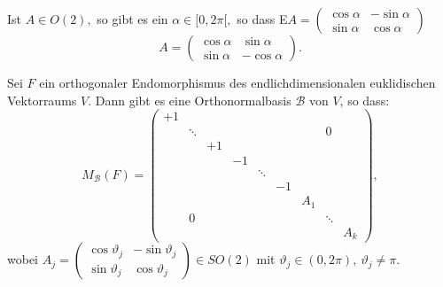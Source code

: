 \documentclass[9pt, a4paper, twocolumn, landscape]{article}
\newcommand{\comment}[1]{}
\begin{document}
\begin{lemma}
Ist \(A \in O(2),\) so gibt es ein \(\alpha \in[0,2 \pi[,\) so dass
E$A=\left(\begin{array}{cc}\cos \alpha  & -\sin \alpha 
\\ \sin \alpha & \cos \alpha\end{array}\right)$ 
$$A=\left(\begin{array}{cc}\cos \alpha & \sin \alpha \\ \sin \alpha & -\cos \alpha\end{array}\right).$$
\end{lemma}

\comment{
\begin{theorem}
Jeder unitäre Endomorphismus \(F\) eines endlich dimensionalen unitären Vektorraumes besitzt eine Orthonormalbasis aus Eigenvektoren von \(F .\) 
\end{theorem}

\begin{corollary}
Zu \(A \in U(n)\) gibt es ein \(S \in U(n)\) mit
$$
 S^\dagger \cdot A \cdot S = \left(\begin{array}{ccc}\lambda_{1} & & 0 \\ & \ddots & \\ 0 & & \lambda_{n}\end{array}\right)
 $$
wobei $\lambda_{i} \in \mathbb{C}$ mit $|\lambda_{i}|=1$ f"ur $i=1, ..., n $.
\end{corollary}
}

\begin{theorem}
Sei $F$ ein orthogonaler Endomorphismus des endlichdimensionalen euklidischen Vektorraums $V$. Dann gibt es eine Orthonormalbasis $\mathcal{B}$ von $V$, so dass:
$$M_\mathcal{B}(F) =
\left( \begin{array}{ccccccccc}
{+1} & {} & {} & {} & {} & {} & {} & {} & {} 
\\ {} & {\ddots} & {} & {} & {} & {} & {} & {0} & {} 
\\ {} & {} & {+1} & {} & {} & {} & {} & {} & {} 
\\ {} & {} & {} & {-1} & {} & {} & {} & {} & {} 
\\ {} & {} & {} & {} & {}\ddots & {} & {} & {} & {} 
\\ {} & {} & {} & {} & {} & {-1} & {} & {} & {} 
\\ {} & {} & {} & {} & {} & {} & {A_1} & {} & {} 
\\ {} & {0} & {} & {} & {} & {} & {} & {\ddots} & {} 
\\ {} & {} & {} & {} & {} & {} & {} & {} & {A_k} 
\end{array} 
\right),$$
wobei $A_{j}=\left(\begin{array}{cc}\cos \vartheta_{j} & -\sin \vartheta_{j} \\ \sin \vartheta_{j} & \cos \vartheta_{j}\end{array}\right) \in SO(2)$ mit $\vartheta_j \in (0, 2\pi), \ \vartheta_j \neq \pi$.

\end{theorem}
\end{document}
